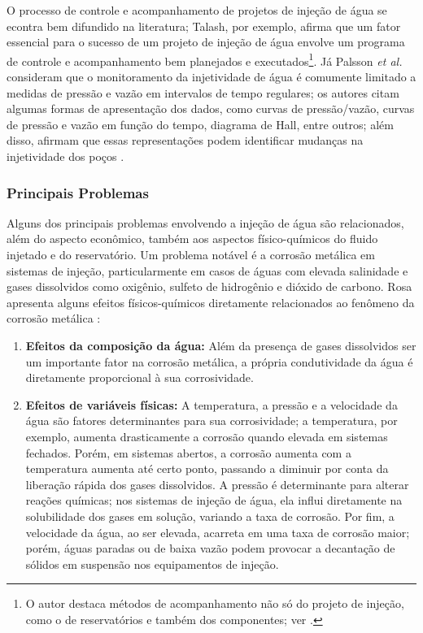 O processo de controle e acompanhamento de projetos de inje\c{c}\~{a}o de \'{a}gua se econtra bem difundido na literatura; Talash, por exemplo, afirma que um fator essencial para o sucesso de um projeto de inje\c{c}\~{a}o de \'{a}gua envolve um programa de controle e acompanhamento bem planejados e executados\footnote{O autor destaca m\'{e}todos de acompanhamento n\~{a}o s\'{o} do projeto de inje\c{c}\~{a}o, como o de reservat\'{o}rios e tamb\'{e}m dos componentes; ver \cite{talash1988}.}. J\'{a} Palsson \textit{et al.} consideram que o monitoramento da injetividade de \'{a}gua \'{e} comumente limitado a medidas de press\~{a}o e vaz\~{a}o em intervalos de tempo regulares; os autores citam algumas formas de apresenta\c{c}\~{a}o dos dados, como curvas de press\~{a}o/vaz\~{a}o, curvas de press\~{a}o e vaz\~{a}o em fun\c{c}\~{a}o do tempo, diagrama de Hall, entre outros; al\'{e}m disso, afirmam que essas representa\c{c}\~{o}es podem identificar mudan\c{c}as na injetividade dos po\c{c}os \cite{PALSSON2003333}.

\subsubsection{Principais Problemas}
Alguns dos principais problemas envolvendo a inje\c{c}\~{a}o de \'{a}gua s\~{a}o relacionados, al\'{e}m do aspecto econ\^{o}mico, tamb\'{e}m aos aspectos f\'{i}sico-qu\'{i}micos do fluido injetado e do reservat\'{o}rio. Um problema not\'{a}vel \'{e} a corros\~{a}o met\'{a}lica em sistemas de inje\c{c}\~{a}o, particularmente em casos de \'{a}guas com elevada salinidade e gases dissolvidos como oxig\^{e}nio, sulfeto de hidrog\^{e}nio e di\'{o}xido de carbono. Rosa apresenta alguns efeitos f\'{i}sicos-qu\'{i}micos diretamente relacionados ao fen\^{o}meno da corros\~{a}o met\'{a}lica \cite[pp. 662-663]{engres}:

\begin{enumerate}
\item \textbf{Efeitos da composi\c{c}\~{a}o da \'{a}gua:} Al\'{e}m da presen\c{c}a de gases dissolvidos ser um importante fator na corros\~{a}o met\'{a}lica, a pr\'{o}pria condutividade da \'{a}gua \'{e} diretamente proporcional \`{a} sua corrosividade.

\item \textbf{Efeitos de vari\'{a}veis f\'{i}sicas:} A temperatura, a press\~{a}o e a velocidade da \'{a}gua s\~{a}o fatores determinantes para sua corrosividade; a temperatura, por exemplo, aumenta drasticamente a corros\~{a}o quando elevada em sistemas fechados. Por\'{e}m, em sistemas abertos, a corros\~{a}o aumenta com a temperatura aumenta at\'{e} certo ponto, passando a diminuir por conta da libera\c{c}\~{a}o r\'{a}pida dos gases dissolvidos. A press\~{a}o \'{e} determinante para alterar rea\c{c}\~{o}es qu\'{i}micas; nos sistemas de inje\c{c}\~{a}o de \'{a}gua, ela influi diretamente na solubilidade dos gases em solu\c{c}\~{a}o, variando a taxa de corros\~{a}o. Por fim, a velocidade da \'{a}gua, ao ser elevada, acarreta em uma taxa de corros\~{a}o maior; por\'{e}m, \'{a}guas paradas ou de baixa vaz\~{a}o podem provocar a decanta\c{c}\~{a}o de s\'{o}lidos em suspens\~{a}o nos equipamentos de inje\c{c}\~{a}o.
\end{enumerate}

